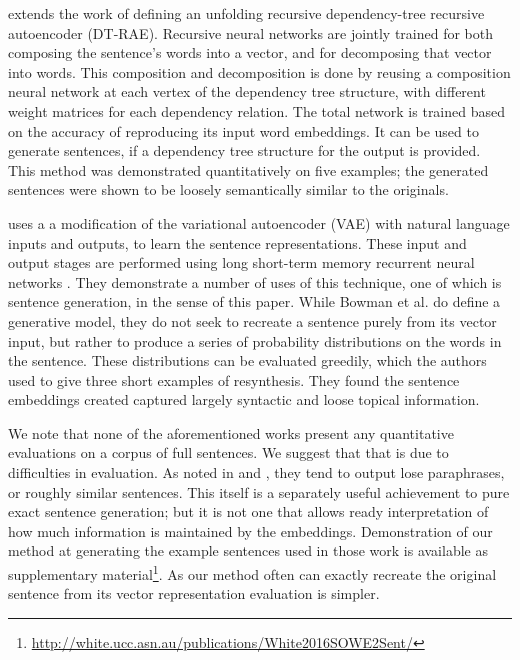 \documentclass[compsoc]{IEEEtran}
\theoremstyle{plain}
\theoremstyle{definition}
\begin{document}
\textcite{iyyer2014generating} extends the work of \textcite{SocherEtAl2011:PoolRAE} defining an unfolding recursive dependency-tree recursive autoencoder (DT-RAE). Recursive neural networks are jointly trained for both composing the sentence's words into a vector, and for decomposing that vector into words. This composition and decomposition is done by reusing a composition neural network at each vertex of the  dependency tree structure, with different weight matrices for each dependency relation. The total network is trained based on the accuracy of reproducing its input word embeddings. It can be used to generate sentences, if a dependency tree structure for the output is provided. This method was demonstrated quantitatively on five examples; the generated sentences were shown to be loosely semantically similar to the originals.


\textcite{Bowman2015SmoothGeneration} uses a a modification of the variational autoencoder (VAE) \parencite{kingma2013auto} with natural language inputs and outputs, to learn the sentence representations. These input and output stages are performed using long short-term memory recurrent neural networks \parencite{hochreiter1997long}. They demonstrate a number of uses of this technique, one of which is sentence generation, in the sense of this paper.
While Bowman et al. do define a generative model, they do not seek to recreate a sentence purely from its vector input, but rather to produce a series of probability distributions on the words in the sentence. These distributions can be evaluated greedily, which the authors used to give three short examples of resynthesis. They found the sentence embeddings created captured largely syntactic and loose topical information. 

We note that none of the aforementioned works present any quantitative evaluations on a corpus of full sentences. We suggest that that is due to difficulties in evaluation. As noted in \textcite{iyyer2014generating} and \textcite{Bowman2015SmoothGeneration}, they tend to output lose paraphrases, or roughly similar sentences. This itself is a separately useful achievement to pure exact sentence generation; but it is not one that allows ready interpretation of how much information is maintained by the embeddings. Demonstration of our method at generating the example sentences used in those work is available as supplementary material\footnote{\url{http://white.ucc.asn.au/publications/White2016SOWE2Sent/}}. As our method often can exactly recreate the original sentence from its vector representation evaluation is simpler.
\end{document}

